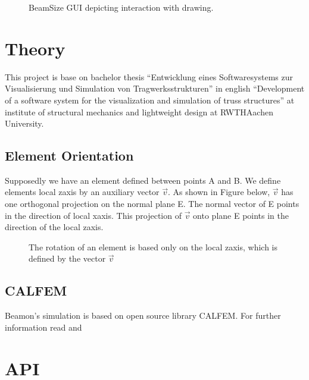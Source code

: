 \documentclass[letterpaper,10pt,english]{sphinxmanual}
\begin{document}
\begin{figure}[htbp]
\centering
\capstart

\noindent{}
\caption{BeamSize GUI depicting interaction with drawing.}\label{\detokenize{making_a_model:id28}}\end{figure}


\section{Theory}
\label{\detokenize{theory:theory}}\label{\detokenize{theory::doc}}
This project is base on bachelor thesis “Entwicklung eines Softwaresystems zur Visualisierung und Simulation von
Tragwerksstrukturen” in english “Development of a software system for the visualization and simulation of truss
structures” at institute of structural mechanics and lightweight design at RWTH\sphinxhyphen{}Aachen University.


\subsection{Element Orientation}
\label{\detokenize{theory:element-orientation}}
Supposedly we have an element defined between points A and B.
We define elements local z\sphinxhyphen{}axis by an auxiliary vector \(\vec{v}\). As shown in Figure below, \(\vec{v}\) has one
orthogonal projection on the normal plane E. The normal vector of E points in the direction
of local x\sphinxhyphen{}axis. This projection of \(\vec{v}\) onto plane E points in the direction of the local z\sphinxhyphen{}axis.

\begin{figure}[htbp]
\centering
\capstart

\noindent{}
\caption{The rotation of an element is based only on the local z\sphinxhyphen{}axis, which is defined by the vector \(\vec{v}\)}\label{\detokenize{theory:id1}}\end{figure}


\subsection{CALFEM}
\label{\detokenize{theory:calfem}}
Beamon’s simulation is based on open source library CALFEM. For further information read
 and


\section{API}
\label{\detokenize{api:api}}\label{\detokenize{api::doc}}
\end{document}
